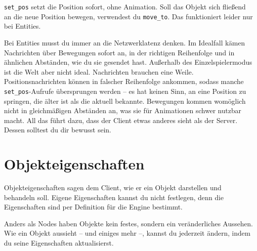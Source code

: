\texttt{set\_\allowbreak{}pos} setzt die Position sofort, ohne
Animation. Soll das Objekt sich fließend an die neue Position bewegen,
verwendest du \texttt{move\_\allowbreak{}to}. Das funktioniert leider
nur bei Entities.

\begin{Shaded}
\begin{Highlighting}[]
\OperatorTok{:}\OperatorTok{(\{}  \OperatorTok{=} \OperatorTok{,}  \OperatorTok{=}  \OperatorTok{+} \OperatorTok{,}  \OperatorTok{=}  \OperatorTok{\})}
\end{Highlighting}
\end{Shaded}

Bei Entities musst du immer an die Netzwerklatenz denken. Im Idealfall
kämen Nachrichten über Bewegungen sofort an, in der richtigen
Reihenfolge und in ähnlichen Abständen, wie du sie gesendet hast.
Außerhalb des Einzelspielermodus ist die Welt aber nicht ideal.
Nachrichten brauchen eine Weile. Positionsnachrichten können in falscher
Reihenfolge ankommen, sodass manche
\texttt{set\_\allowbreak{}pos}-Aufrufe übersprungen werden -- es hat
keinen Sinn, an eine Position zu springen, die älter ist als die aktuell
bekannte. Bewegungen kommen womöglich nicht in gleichmäßigen Abständen
an, was sie für Animationen schwer nutzbar macht. All das führt dazu,
dass der Client etwas anderes sieht als der Server. Dessen solltest du
dir bewusst sein.

\section{Objekteigenschaften}\label{objekteigenschaften}

Objekteigenschaften sagen dem Client, wie er ein Objekt darstellen und
behandeln soll. Eigene Eigenschaften kannst du nicht festlegen, denn die
Eigenschaften sind per Definition für die Engine bestimmt.

Anders als Nodes haben Objekte kein festes, sondern ein veränderliches
Aussehen. Wie ein Objekt aussieht -- und einiges mehr --, kannst du
jederzeit ändern, indem du seine Eigenschaften aktualisierst.

\begin{Shaded}
\begin{Highlighting}[]
\OperatorTok{:}\OperatorTok{(\{}
     \OperatorTok{=} \OperatorTok{,}
     \OperatorTok{=} \OperatorTok{,}
     \OperatorTok{=} \OperatorTok{\{}  \OperatorTok{\},}
     \OperatorTok{=} \OperatorTok{\{}  \OperatorTok{=} \OperatorTok{,}  \OperatorTok{=}  \OperatorTok{\},}
\OperatorTok{\})}
\end{Highlighting}
\end{Shaded}

